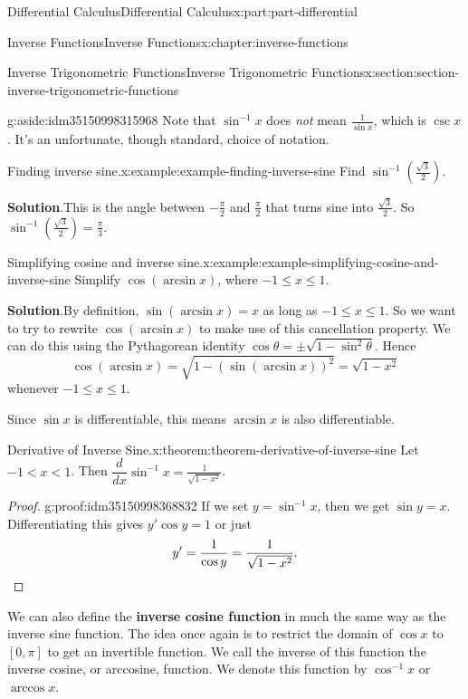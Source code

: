 \documentclass[twoside,10pt,]{tufte-book}
\newcommand{\blocktitlefont}{\relax}
\newcommand{\terminology}[1]{\textbf{#1}}
\numberwithin{equation}{part}
\newcommand{\qedhere}{\relax}
\newcommand{\dv}[3][]{\dfrac{d^{#1} #2}{d #3^{#1}}}
\begin{document}
\begin{partptx}{Differential Calculus}{}{Differential Calculus}{}{}{x:part:part-differential}
\begin{chapterptx}{Inverse Functions}{}{Inverse Functions}{}{}{x:chapter:inverse-functions}
\begin{sectionptx}{Inverse Trigonometric Functions}{}{Inverse Trigonometric Functions}{}{}{x:section:section-inverse-trigonometric-functions}
\begin{aside}{}{g:aside:idm35150998315968}
Note that \(\sin^{-1}x\) does \emph{not} mean \(\frac{1}{\sin x}\), which is \(\csc x\). It's an unfortunate, though standard, choice of notation.%
\end{aside}
%
\begin{example}{Finding inverse sine.}{x:example:example-finding-inverse-sine}%
Find \(\sin^{-1}(\frac{\sqrt{3}}{2})\).%
\par\smallskip%
\noindent\textbf{\blocktitlefont Solution}.\hypertarget{g:solution:idm35150998312512}{}\quad{}This is the angle between \(-\frac{\pi}{2}\) and \(\frac{\pi}{2}\) that turns sine into \(\frac{\sqrt{3}}{2}\). So \(\sin^{-1}(\frac{\sqrt{3}}{2}) = \frac{\pi}{3}\).%
\end{example}
\begin{example}{Simplifying cosine and inverse sine.}{x:example:example-simplifying-cosine-and-inverse-sine}%
Simplify \(\cos(\arcsin x)\), where \(-1\leq x\leq 1\).%
\par\smallskip%
\noindent\textbf{\blocktitlefont Solution}.\hypertarget{g:solution:idm35150998308800}{}\quad{}By definition, \(\sin(\arcsin x) = x\) as long as \(-1\leq x\leq 1\). So we want to try to rewrite \(\cos(\arcsin x)\) to make use of this cancellation property. We can do this using the Pythagorean identity \(\cos \theta = \pm\sqrt{1-\sin^{2}\theta}\). Hence%
\begin{equation*}
\cos(\arcsin x) = \sqrt{1-(\sin(\arcsin x))^{2}} = \sqrt{1 - x^{2}}
\end{equation*}
whenever \(-1\leq x\leq 1\).%
\end{example}
Since \(\sin x\) is differentiable, this means \(\arcsin x\) is also differentiable.%
\begin{theorem}{Derivative of Inverse Sine.}{}{x:theorem:theorem-derivative-of-inverse-sine}%
Let \(-1 < x < 1\). Then \(\dv{}{x}\sin^{-1}x = \frac{1}{\sqrt{1-x^{2}}}\).%
\end{theorem}
\begin{proof}{}{g:proof:idm35150998368832}
If we set \(y = \sin^{-1}x\), then we get \(\sin y = x\). Differentiating this gives \(y'\cos y = 1\) or just%
\begin{equation*}
y' = \frac{1}{\cos y} = \frac{1}{\sqrt{1-x^{2}}}.\qedhere
\end{equation*}
%
\end{proof}
We can also define the \terminology{inverse cosine function} in much the same way as the inverse sine function. The idea once again is to restrict the domain of \(\cos x\) to \([0,\pi]\) to get an invertible function. We call the inverse of this function the inverse cosine, or arccosine, function. We denote this function by \(\cos^{-1}x\) or \(\arccos x\).%

\end{sectionptx}
\end{chapterptx}
\end{partptx}
\end{document}
